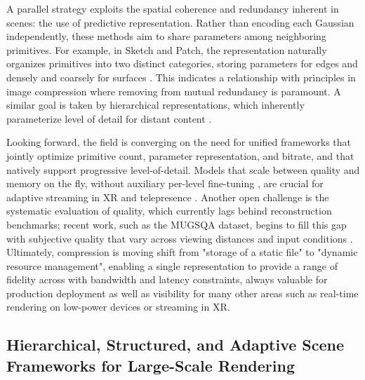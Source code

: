 \documentclass[11pt,a4paper]{article}
\begin{document}
A parallel strategy exploits the spatial coherence and redundancy inherent in scenes: the use of predictive representation. Rather than encoding each Gaussian independently, these methods aim to share parameters among neighboring primitives. For example, in Sketch and Patch, the representation naturally organizes primitives into two distinct categories, storing parameters for edges and densely and coarsely for surfaces \cite{arxiv:2501.13045v1}. This indicates a relationship with principles in image compression where removing from mutual redundancy is paramount. A similar goal is taken by hierarchical representations, which inherently parameterize level of detail for distant content \cite{arxiv:2406.12080v1}.

Looking forward, the field is converging on the need for unified frameworks that jointly optimize primitive count, parameter representation, and bitrate, and that natively support progressive level-of-detail. Models that scale between quality and memory on the fly, without auxiliary per-level fine-tuning \cite{arxiv:2501.13558v3}, are crucial for adaptive streaming in XR and telepresence \cite{arxiv:2412.06257v2}. Another open challenge is the systematic evaluation of quality, which currently lags behind reconstruction benchmarks; recent work, such as the MUGSQA dataset, begins to fill this gap with subjective quality that vary across viewing distances and input conditions \cite{arxiv:2502.13196v2}. Ultimately, compression is moving shift from "storage of a static file" to "dynamic resource management", enabling a single representation to provide a range of fidelity across with bandwidth and latency constraints, always valuable for production deployment as well as visibility for many other areas such as real-time rendering on low-power devices or streaming in XR.


\subsection{Hierarchical, Structured, and Adaptive Scene Frameworks for Large-Scale Rendering}
\end{document}
